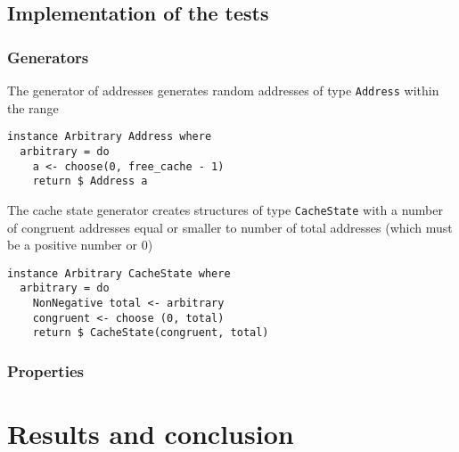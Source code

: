 \documentclass[11pt]{article}
\begin{document}
\clearpage
\subsection{Implementation of the tests}
\subsubsection{Generators}
The generator of addresses generates random addresses of type \texttt{Address} within the range
\begin{verbatim}
instance Arbitrary Address where
  arbitrary = do
    a <- choose(0, free_cache - 1)
    return $ Address a
\end{verbatim}

The cache state generator creates structures of type \texttt{CacheState} with a number of congruent addresses equal or smaller to number of total addresses (which must be a positive number or 0)
\begin{verbatim}
instance Arbitrary CacheState where
  arbitrary = do
    NonNegative total <- arbitrary
    congruent <- choose (0, total)
    return $ CacheState(congruent, total)
\end{verbatim}

\subsubsection{Properties}
\section{Results and conclusion}

\clearpage



\clearpage
\end{document}
